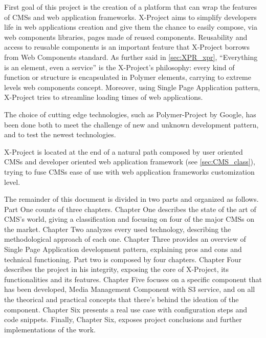 First goal of this project is the creation of a platform that can wrap the features of CMSs and web application frameworks. 
X-Project aims to simplify developers life in web applications creation and give them the chance to easily compose, via web components libraries, pages made of reused components.
Reusability and access to reusable components is an important feature that X-Project borrows from Web Components standard.
As further said in \ref{sec:XPR_xpr}, ``Everything is an element, even a service'' is the X-Project's philosophy: every kind of function or structure is encapsulated in Polymer elements, carrying to extreme levels web components concept. 
Moreover, using Single Page Application pattern, X-Project tries to streamline loading times of web applications.

The choice of cutting edge technologies, such as Polymer-Project by Google, has been done both to meet the challenge of new and unknown development pattern, and to test the newest technologies.

X-Project is located at the end of a natural path composed by user oriented CMSs and developer oriented web application framework (see \ref{sec:CMS_class}), trying to fuse CMSs ease of use with web application frameworks customization level.

The remainder of this document is divided in two parts and organized as follows. Part One counts of three chapters. Chapter One describes the state of the art of CMS's world, giving a classification and focusing on four of the major CMSs on the market. Chapter Two analyzes every used technology, describing the methodological approach of each one. Chapter Three provides an overview of Single Page Application development pattern, explaining pros and cons and technical functioning.
Part two is composed by four chapters. Chapter Four describes the project in his integrity, exposing the core of X-Project, its functionalities and its features.
Chapter Five focuses on a specific component that has been developed, Media Management Component with S3 service, and on all the theorical and practical concepts that there's behind the ideation of the component. Chapter Six presents a real use case with configuration steps and code snippets.
Finally, Chapter Six, exposes project conclusions and further implementations of the work.



